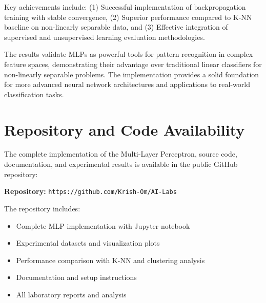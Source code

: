\documentclass[11pt,a4paper]{article}
\begin{document}
Key achievements include: (1) Successful implementation of backpropagation training with stable convergence, (2) Superior performance compared to K-NN baseline on non-linearly separable data, and (3) Effective integration of supervised and unsupervised learning evaluation methodologies.

The results validate MLPs as powerful tools for pattern recognition in complex feature spaces, demonstrating their advantage over traditional linear classifiers for non-linearly separable problems. The implementation provides a solid foundation for more advanced neural network architectures and applications to real-world classification tasks.

\section{Repository and Code Availability}

The complete implementation of the Multi-Layer Perceptron, source code, documentation, and experimental results is available in the public GitHub repository:

\textbf{Repository:} \texttt{https://github.com/Krish-Om/AI-Labs}

The repository includes:
\begin{itemize}
\item Complete MLP implementation with Jupyter notebook
\item Experimental datasets and visualization plots
\item Performance comparison with K-NN and clustering analysis
\item Documentation and setup instructions
\item All laboratory reports and analysis
\end{itemize}
\end{document}
